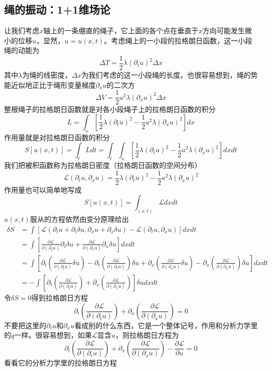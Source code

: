 \documentclass[a4paper,11pt]{ctexart}
\newcommand{\beq}{\begin{equation}}
\newcommand{\eeq}{\end{equation}}
\newcommand{\bea}{\begin{equation}\begin{aligned}}
\newcommand{\eea}{\end{aligned}\end{equation}}
\newcommand{\lag}{\mathcal{L}}
\begin{document}
\subsection{绳的振动：1+1维场论}
让我们考虑$x$轴上的一条绷直的绳子，它上面的各个点在垂直于$x$方向可能发生微小的位移$u$，显然，$u = u(x,t)$。考虑绳上的一小段的拉格朗日函数，这一小段绳的动能为
\beq
\Delta T = \frac{1}{2} \lambda (\partial_t u)^2 \Delta x
\eeq
其中$\lambda$为绳的线密度，$\Delta x$为我们考虑的这一小段绳的长度。也很容易想到，绳的势能近似地正比于绳形变量梯度$\partial_x u$的二次方
\beq
\Delta V = \frac{1}{2} a^2 \lambda (\partial_x u)^2 \Delta x
\eeq
整根绳子的拉格朗日函数就是对各小段绳子上的拉格朗日函数的积分
\beq
L = \int_x [\frac{1}{2} \lambda (\partial_t u)^2 - \frac{1}{2} a^2 \lambda (\partial_x u)^2] dx
\eeq
作用量就是对拉格朗日函数的积分
\beq
S[u(x,t)] = \int_t L dt = \int_t \int_x[\frac{1}{2} \lambda (\partial_t u)^2 - \frac{1}{2} a^2 \lambda (\partial_x u)^2] dx dt
\eeq
我们把被积函数称为拉格朗日密度（拉格朗日函数的空间分布）
\beq
\lag(\partial_t u,\partial_x u) = \frac{1}{2} \lambda (\partial_t u)^2 - \frac{1}{2} a^2 \lambda (\partial_x u)^2
\eeq
作用量也可以简单地写成
\beq
S[u(x,t)] = \int_{(x,t)} \lag dx dt
\eeq
$u(x,t)$服从的方程依然由变分原理给出
\bea
\delta S &= \int[ \lag(\partial_t u + \partial_t \delta u ,\partial_x u + \partial_x \delta u) - \lag(\partial_t u,\partial_x u)]dxdt \\
&= \int [\frac{\partial \lag}{\partial(\partial_t u)} \partial_t \delta u + \frac{\partial \lag}{\partial(\partial_x u)} \partial_x \delta u]dxdt \\
&= \int [\partial_t(\frac{\partial \lag}{\partial(\partial_t u)} \delta u) - \partial_t(\frac{\partial \lag}{\partial(\partial_t u)}) \delta u + \partial_x(\frac{\partial \lag}{\partial(\partial_x u)} \delta u) - \partial_x(\frac{\partial \lag}{\partial(\partial_x u)}) \delta u ] dxdt \\
&= - \int[\partial_t(\frac{\partial \lag}{\partial(\partial_t u)}) + \partial_x(\frac{\partial \lag}{\partial(\partial_x u)})]\delta u dxdt
\eea
令$\delta S = 0$得到拉格朗日方程
\beq
\partial_t(\frac{\partial \lag}{\partial(\partial_t u)}) + \partial_x(\frac{\partial \lag}{\partial(\partial_x u)}) = 0
\eeq
不要把这里的$\partial_t u$和$\partial_x u$看成别的什么东西，它是一个整体记号，作用和分析力学里的$\dot{q}$一样。很容易想到，如果$\lag$显含$u$，则拉格朗日方程为
\beq
\partial_t(\frac{\partial \lag}{\partial(\partial_t u)}) + \partial_x(\frac{\partial \lag}{\partial(\partial_x u)}) - \frac{\partial \lag}{\partial u} = 0
\eeq
看看它的分析力学里的拉格朗日方程
\end{document}
